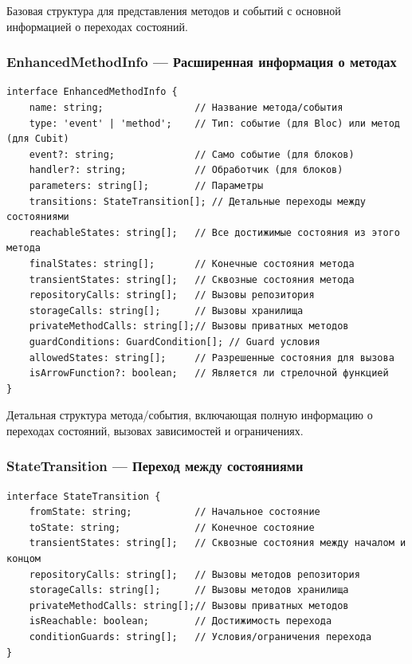 \documentclass[14pt, russian]{scrartcl}
\begin{document}
Базовая структура для представления методов и событий с основной информацией о переходах состояний.

\subsubsection{EnhancedMethodInfo — Расширенная информация о методах}

\begin{verbatim}
interface EnhancedMethodInfo {
    name: string;                // Название метода/события
    type: 'event' | 'method';    // Тип: событие (для Bloc) или метод (для Cubit)
    event?: string;              // Само событие (для блоков)
    handler?: string;            // Обработчик (для блоков)
    parameters: string[];        // Параметры
    transitions: StateTransition[]; // Детальные переходы между состояниями
    reachableStates: string[];   // Все достижимые состояния из этого метода
    finalStates: string[];       // Конечные состояния метода
    transientStates: string[];   // Сквозные состояния метода
    repositoryCalls: string[];   // Вызовы репозитория
    storageCalls: string[];      // Вызовы хранилища
    privateMethodCalls: string[];// Вызовы приватных методов
    guardConditions: GuardCondition[]; // Guard условия
    allowedStates: string[];     // Разрешенные состояния для вызова
    isArrowFunction?: boolean;   // Является ли стрелочной функцией
}
\end{verbatim}

Детальная структура метода/события, включающая полную информацию о переходах состояний, вызовах зависимостей и ограничениях.

\subsubsection{StateTransition — Переход между состояниями}

\begin{verbatim}
interface StateTransition {
    fromState: string;           // Начальное состояние
    toState: string;             // Конечное состояние
    transientStates: string[];   // Сквозные состояния между началом и концом
    repositoryCalls: string[];   // Вызовы методов репозитория
    storageCalls: string[];      // Вызовы методов хранилища
    privateMethodCalls: string[];// Вызовы приватных методов
    isReachable: boolean;        // Достижимость перехода
    conditionGuards: string[];   // Условия/ограничения перехода
}
\end{verbatim}
\end{document}
